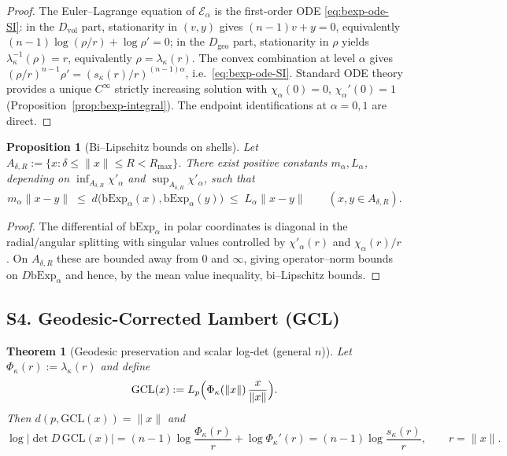 \documentclass{article}
\newtheorem{theorem}{Theorem}
\newtheorem{proposition}{Proposition}
\theoremstyle{definition}
\theoremstyle{remark}
\begin{document}
\begin{proof}
The Euler--Lagrange equation of $\mathcal E_\alpha$ is the first-order ODE
\eqref{eq:bexp-ode-SI}: in the $D_{\mathrm{vol}}$ part, stationarity in $(v,y)$
gives $(n-1)v+y=0$, equivalently $(n-1)\log(\rho/r)+\log\rho'=0$; in the
$D_{\mathrm{geo}}$ part, stationarity in $\rho$ yields $\lambda_\kappa^{-1}(\rho)=r$,
equivalently $\rho=\lambda_\kappa(r)$. The convex combination at level $\alpha$
gives $(\rho/r)^{n-1}\rho'=(s_\kappa(r)/r)^{(n-1)\alpha}$, i.e.\
\eqref{eq:bexp-ode-SI}. Standard ODE theory provides a unique $C^\infty$
strictly increasing solution with $\chi_\alpha(0)=0$, $\chi_\alpha'(0)=1$
(Proposition~\ref{prop:bexp-integral}). The endpoint identifications at
$\alpha=0,1$ are direct.
\end{proof}

\begin{proposition}[Bi--Lipschitz bounds on shells]
Let $A_{\delta,R}:=\{x:\delta\le\|x\|\le R<R_{\max}\}$. There exist positive constants
$m_\alpha,L_\alpha$, depending on $\inf_{A_{\delta,R}}\chi'_\alpha$ and
$\sup_{A_{\delta,R}}\chi'_\alpha$, such that
\[
m_\alpha\|x-y\|
\;\le\;
d\bigl(\mathrm{bExp}_\alpha(x),\mathrm{bExp}_\alpha(y)\bigr)
\;\le\;
L_\alpha\|x-y\|\qquad(x,y\in A_{\delta,R}).
\]
\end{proposition}

\begin{proof}
The differential of $\mathrm{bExp}_\alpha$ in polar coordinates is diagonal in the radial/angular
splitting with singular values controlled by $\chi'_\alpha(r)$ and $\chi_\alpha(r)/r$. On
$A_{\delta,R}$ these are bounded away from $0$ and $\infty$, giving operator--norm bounds on
$D\mathrm{bExp}_\alpha$ and hence, by the mean value inequality, bi--Lipschitz bounds.
\end{proof}

\subsection*{S4. Geodesic-Corrected Lambert (GCL)}

\begin{theorem}[Geodesic preservation and scalar log-det (general $n$)]\label{thm:gcl}
Let $\Phi_\kappa(r):=\lambda_\kappa(r)$ and define
\[
\mathrm{GCL}(x):=L_p\Bigl(\Phi_\kappa(\|x\|)\,\frac{x}{\|x\|}\Bigr).
\]
Then $d(p,\mathrm{GCL}(x))=\|x\|$ and
\[
\log\bigl|\det D\,\mathrm{GCL}(x)\bigr|
=(n-1)\log\frac{\Phi_\kappa(r)}{r}+\log \Phi_\kappa'(r)
=(n-1)\log\frac{s_\kappa(r)}{r},
\qquad r=\|x\|.
\]
\end{theorem}
\end{document}
